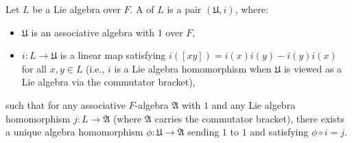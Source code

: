 Let $L$ be a Lie algebra over $F$. A  of $L$ is a pair $(\mathfrak{U}, i)$, where:
\begin{itemize}
\item $\mathfrak{U}$ is an associative algebra with $1$ over $F$,
\item $i: L \to \mathfrak{U}$ is a linear map satisfying $i([xy]) = i(x)i(y) - i(y)i(x)$ for all $x, y \in L$ (i.e., $i$ is a Lie algebra homomorphism when $\mathfrak{U}$ is viewed as a Lie algebra via the commutator bracket),
\end{itemize}
such that for any associative $F$-algebra $\mathfrak{A}$ with $1$ and any Lie algebra homomorphism $j: L \to \mathfrak{A}$ (where $\mathfrak{A}$ carries the commutator bracket), there exists a unique algebra homomorphism $\phi: \mathfrak{U} \to \mathfrak{A}$ sending $1$ to $1$ and satisfying $\phi \circ i = j$.

